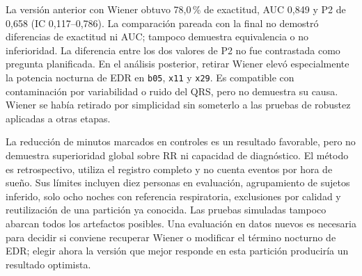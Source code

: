\documentclass[10pt,a4paper]{article}
\begin{document}
La versión anterior con Wiener obtuvo 78,0\,\% de exactitud, AUC 0,849 y P2 de 0,658 (IC 0,117--0,786). La comparación pareada con la final no demostró diferencias de exactitud ni AUC; tampoco demuestra equivalencia o no inferioridad. La diferencia entre los dos valores de P2 no fue contrastada como pregunta planificada. En el análisis posterior, retirar Wiener elevó especialmente la potencia nocturna de EDR en \texttt{b05}, \texttt{x11} y \texttt{x29}. Es compatible con contaminación por variabilidad o ruido del QRS, pero no demuestra su causa. Wiener se había retirado por simplicidad sin someterlo a las pruebas de robustez aplicadas a otras etapas.

La reducción de minutos marcados en controles es un resultado favorable, pero no demuestra superioridad global sobre RR ni capacidad de diagnóstico. El método es retrospectivo, utiliza el registro completo y no cuenta eventos por hora de sueño. Sus límites incluyen diez personas en evaluación, agrupamiento de sujetos inferido, solo ocho noches con referencia respiratoria, exclusiones por calidad y reutilización de una partición ya conocida. Las pruebas simuladas tampoco abarcan todos los artefactos posibles. Una evaluación en datos nuevos es necesaria para decidir si conviene recuperar Wiener o modificar el término nocturno de EDR; elegir ahora la versión que mejor responde en esta partición produciría un resultado optimista.
\end{document}
